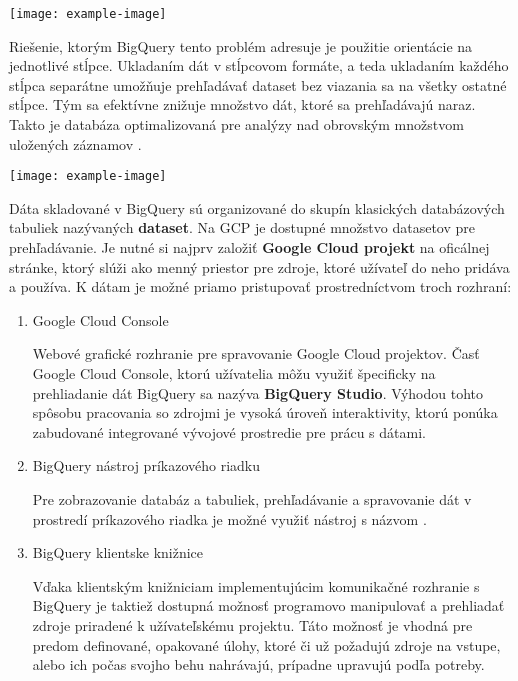 \begin{center}
\noindent\texttt{[image: example-image]}    
\end{center}

Riešenie, ktorým BigQuery tento problém adresuje je použitie orientácie na jednotlivé stĺpce. 
Ukladaním dát v stĺpcovom formáte, a teda ukladaním každého stĺpca separátne umožňuje prehľadávať dataset bez viazania sa na všetky ostatné stĺpce.
Tým sa efektívne znižuje množstvo dát, ktoré sa prehľadávajú naraz.
Takto je databáza optimalizovaná pre analýzy nad obrovským množstvom uložených záznamov \cite{google-bq}.

\begin{center}
\noindent\texttt{[image: example-image]}    
\end{center}

Dáta skladované v BigQuery sú organizované do skupín klasických databázových tabuliek nazývaných \textbf{dataset}.
Na GCP je dostupné množstvo datasetov pre prehľadávanie.
Je nutné si najprv založiť \textbf{Google Cloud projekt} na oficálnej stránke, ktorý slúži ako menný priestor pre zdroje, ktoré užívateľ do neho pridáva a používa.
K dátam je možné priamo pristupovať prostredníctvom troch rozhraní: \cite{google-cloud} 
\begin{enumerate}
    \item Google Cloud Console

    Webové grafické rozhranie pre spravovanie Google Cloud projektov. 
    Časť Google Cloud Console, ktorú užívatelia môžu využiť špecificky na prehliadanie dát BigQuery sa nazýva \textbf{BigQuery Studio}.
    Výhodou tohto spôsobu pracovania so zdrojmi je vysoká úroveň interaktivity, ktorú ponúka zabudované integrované vývojové prostredie pre prácu s dátami. 
    
    \item BigQuery nástroj príkazového riadku

    Pre zobrazovanie databáz a tabuliek, prehľadávanie a spravovanie dát v prostredí príkazového riadka je možné využiť nástroj s názvom \textbf{}. 
    
    \item BigQuery klientske knižnice

    Vďaka klientským knižniciam implementujúcim komunikačné rozhranie s BigQuery je taktiež dostupná možnosť programovo manipulovať a prehliadať zdroje priradené k užívateľskému projektu.
    Táto možnosť je vhodná pre predom definované, opakované úlohy, ktoré či už požadujú zdroje na vstupe, alebo ich počas svojho behu nahrávajú, prípadne upravujú podľa potreby.
\end{enumerate}

